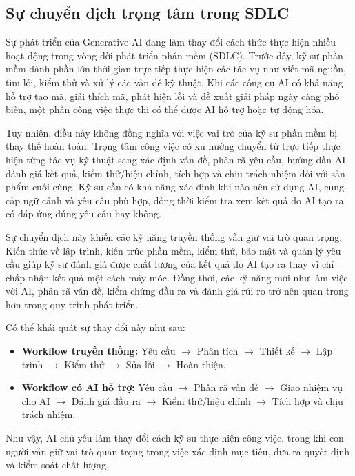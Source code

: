 \subsection{Sự chuyển dịch trọng tâm trong SDLC}

Sự phát triển của Generative AI đang làm thay đổi cách thức thực hiện nhiều hoạt động trong vòng đời phát triển phần mềm (SDLC). Trước đây, kỹ sư phần mềm dành phần lớn thời gian trực tiếp thực hiện các tác vụ như viết mã nguồn, tìm lỗi, kiểm thử và xử lý các vấn đề kỹ thuật. Khi các công cụ AI có khả năng hỗ trợ tạo mã, giải thích mã, phát hiện lỗi và đề xuất giải pháp ngày càng phổ biến, một phần công việc thực thi có thể được AI hỗ trợ hoặc tự động hóa.

Tuy nhiên, điều này không đồng nghĩa với việc vai trò của kỹ sư phần mềm bị thay thế hoàn toàn. Trọng tâm công việc có xu hướng chuyển từ trực tiếp thực hiện từng tác vụ kỹ thuật sang xác định vấn đề, phân rã yêu cầu, hướng dẫn AI, đánh giá kết quả, kiểm thử/hiệu chỉnh, tích hợp và chịu trách nhiệm đối với sản phẩm cuối cùng. Kỹ sư cần có khả năng xác định khi nào nên sử dụng AI, cung cấp ngữ cảnh và yêu cầu phù hợp, đồng thời kiểm tra xem kết quả do AI tạo ra có đáp ứng đúng yêu cầu hay không.

Sự chuyển dịch này khiến các kỹ năng truyền thống vẫn giữ vai trò quan trọng. Kiến thức về lập trình, kiến trúc phần mềm, kiểm thử, bảo mật và quản lý yêu cầu giúp kỹ sư đánh giá được chất lượng của kết quả do AI tạo ra thay vì chỉ chấp nhận kết quả một cách máy móc. Đồng thời, các kỹ năng mới như làm việc với AI, phân rã vấn đề, kiểm chứng đầu ra và đánh giá rủi ro trở nên quan trọng hơn trong quy trình phát triển.

Có thể khái quát sự thay đổi này như sau:

\begin{itemize}
    \item \textbf{Workflow truyền thống:} Yêu cầu $\rightarrow$ Phân tích $\rightarrow$ Thiết kế $\rightarrow$ Lập trình $\rightarrow$ Kiểm thử $\rightarrow$ Sửa lỗi $\rightarrow$ Hoàn thiện.
    \item \textbf{Workflow có AI hỗ trợ:} Yêu cầu $\rightarrow$ Phân rã vấn đề $\rightarrow$ Giao nhiệm vụ cho AI $\rightarrow$ Đánh giá đầu ra $\rightarrow$ Kiểm thử/hiệu chỉnh $\rightarrow$ Tích hợp và chịu trách nhiệm.
\end{itemize}

Như vậy, AI chủ yếu làm thay đổi cách kỹ sư thực hiện công việc, trong khi con người vẫn giữ vai trò quan trọng trong việc xác định mục tiêu, đưa ra quyết định và kiểm soát chất lượng.
